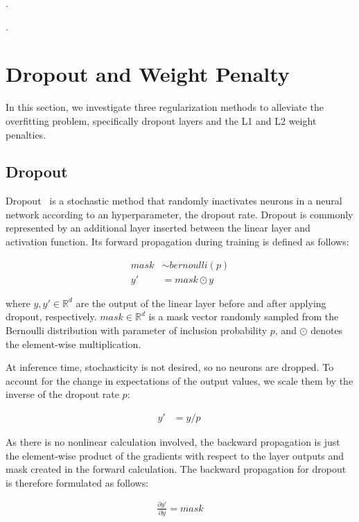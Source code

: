 \documentclass{article}
\begin{document}
\questionEleven.

\questionTwelve.





\section{Dropout and Weight Penalty}
\label{sec:task2.1} 

In this section, we investigate three regularization methods to 
alleviate the overfitting problem, specifically dropout layers 
and the L1 and L2 weight penalties.

\subsection{Dropout}

Dropout~\cite{srivastava2014dropout}
is a stochastic method that randomly inactivates
neurons in a neural network according to an hyperparameter, the
dropout rate. Dropout is commonly represented by an 
additional layer inserted between the linear layer and 
activation function.
Its forward propagation during training is defined as follows:

\begin{align}
    mask &\sim bernoulli(p)\\
    y' &= mask \odot y\
\end{align}

where $y, y' \in \mathbb{R}^d$ are the output of the linear layer 
before and after applying dropout, 
respectively. $mask \in \mathbb{R}^d$ is a mask vector randomly sampled from the
Bernoulli distribution with parameter of inclusion probability
$p$, and $\odot$ denotes the element-wise multiplication.

At inference time, stochasticity is not desired, so no neurons
are dropped. To account for the change in expectations of the
output values, we scale them by the inverse of the dropout rate
$p$:

\begin{align}
    y' &= y/p\
\end{align}

As there is no nonlinear calculation involved, the backward
propagation is just the element-wise product of the gradients
with respect to the layer outputs and mask created
in the forward calculation. The backward propagation for
dropout is therefore formulated as follows:

\begin{align}
    \frac{\partial y'}{\partial y} = mask
\end{align}
\end{document}
